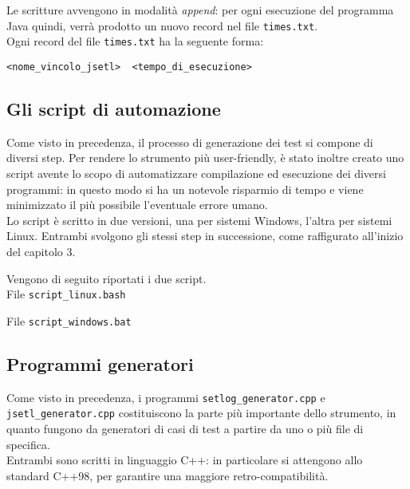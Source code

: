 Le scritture avvengono in modalità \emph{append}: per ogni esecuzione del programma Java quindi, verrà prodotto un nuovo record nel file \texttt{times.txt}.\\

Ogni record del file \texttt{times.txt} ha la seguente forma:
\begin{verbatim}
<nome_vincolo_jsetl>  <tempo_di_esecuzione>
\end{verbatim}

\subsection{Gli script di automazione}
Come visto in precedenza, il processo di generazione dei test si compone di diversi step. Per rendere lo strumento più user-friendly, è stato inoltre creato uno script avente lo scopo di automatizzare compilazione ed esecuzione dei diversi programmi: in questo modo si ha un notevole risparmio di tempo e viene minimizzato il più possibile l'eventuale errore umano.\\

Lo script è scritto in due versioni, una per sistemi Windows, l'altra per sistemi Linux. Entrambi svolgono gli stessi step in successione, come raffigurato all'inizio del capitolo 3.

\clearpage

Vengono di seguito riportati i due script.\\

File \texttt{script\_linux.bash}


\clearpage

File \texttt{script\_windows.bat}


\clearpage

\subsection{Programmi generatori}

Come visto in precedenza, i programmi \texttt{setlog\_generator.cpp} e \texttt{jsetl\_generator.cpp} costituiscono la parte più importante dello strumento, in quanto fungono da generatori di casi di test a partire da uno o più file di specifica.\\
Entrambi sono scritti in linguaggio C++: in particolare si attengono allo standard C++98, per garantire una maggiore retro-compatibilità.\\

